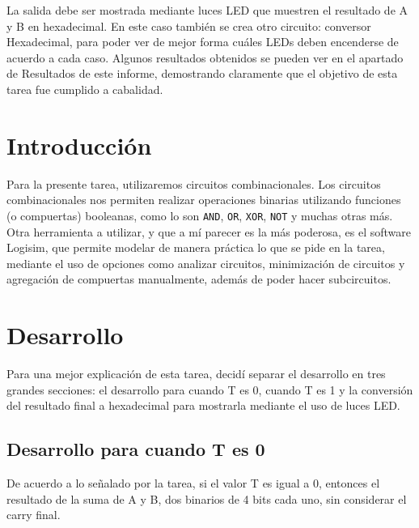 \documentclass[a4paper,11pt]{article}
\begin{document}
La salida debe ser mostrada mediante luces LED que muestren el resultado de A y B en hexadecimal. En este caso también se crea otro circuito: conversor Hexadecimal, para poder ver de mejor forma cuáles LEDs deben encenderse de acuerdo a cada caso. Algunos resultados obtenidos se pueden ver en el apartado de Resultados de este informe, demostrando claramente que el objetivo de esta tarea fue cumplido a cabalidad.

\section{Introducción}

Para la presente tarea, utilizaremos circuitos combinacionales. Los circuitos combinacionales nos permiten realizar operaciones binarias utilizando funciones (o compuertas) booleanas, como lo son \texttt{AND}, \texttt{OR}, \texttt{XOR}, \texttt{NOT} y muchas otras más.\\

Otra herramienta a utilizar, y que a mí parecer es la más poderosa, es el software Logisim, que permite modelar de manera práctica lo que se pide en la tarea, mediante el uso de opciones como analizar circuitos, minimización de circuitos y agregación de compuertas manualmente, además de poder hacer subcircuitos.

\section{Desarrollo}

Para una mejor explicación de esta tarea, decidí separar el desarrollo en tres grandes secciones: el desarrollo para cuando T es 0, cuando T es 1 y la conversión del resultado final a hexadecimal para mostrarla mediante el uso de luces LED.

\subsection{Desarrollo para cuando T es 0}

De acuerdo a lo señalado por la tarea, si el valor T es igual a 0, entonces el resultado de la suma de A y B, dos binarios de 4 bits cada uno, sin considerar el carry final.\\
\end{document}
